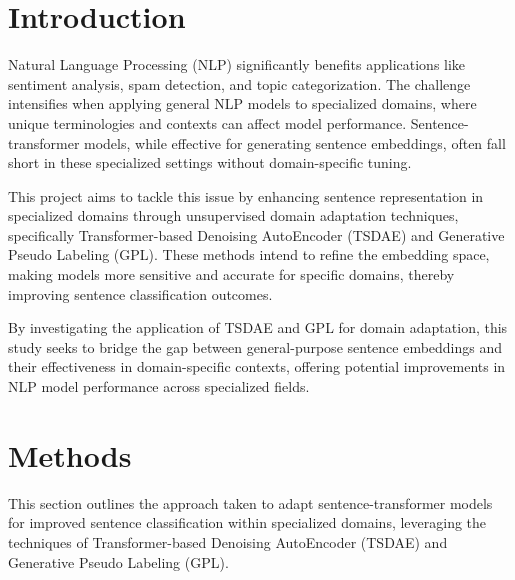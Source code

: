 \documentclass[fleqn,moreauthors,10pt]{ds_report}
\affiliation{\textit{Advisors: Boshko Koloski}}
\begin{document}
\flushbottom 

\maketitle 

\thispagestyle{empty} 


\section*{Introduction}

Natural Language Processing (NLP) significantly benefits applications like sentiment analysis, spam detection, and topic categorization. The challenge intensifies when applying general NLP models to specialized domains, where unique terminologies and contexts can affect model performance. Sentence-transformer models, while effective for generating sentence embeddings, often fall short in these specialized settings without domain-specific tuning.

This project aims to tackle this issue by enhancing sentence representation in specialized domains through unsupervised domain adaptation techniques, specifically Transformer-based Denoising AutoEncoder (TSDAE) and Generative Pse\-udo Labeling (GPL). These methods intend to refine the embedding space, making models more sensitive and accurate for specific domains, thereby improving sentence classification outcomes.

By investigating the application of TSDAE and GPL for domain adaptation, this study seeks to bridge the gap between general-purpose sentence embeddings and their effectiveness in domain-specific contexts, offering potential improvements in NLP model performance across specialized fields.



\section*{Methods}

This section outlines the approach taken to adapt sentence-transformer models for improved sentence classification within specialized domains, leveraging the techniques of Transformer-based Denoising AutoEncoder (TSDAE) and Generative Pse\-udo Labeling (GPL).
\end{document}
